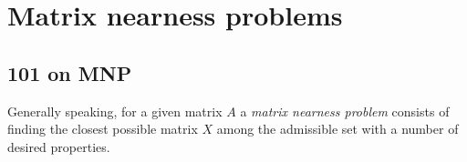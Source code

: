 \section{Matrix nearness problems}



\subsection{ 101 on MNP }

Generally speaking, for a given matrix \( A \) a \emph{matrix nearness problem} consists of finding the closest possible matrix \( X \) among the admissible set with a number of desired properties.


























